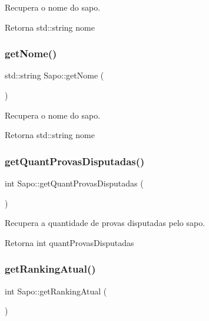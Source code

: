 Recupera o nome do sapo. 

\begin{DoxyReturn}{Retorna}
std\+::string nome 
\end{DoxyReturn}
\mbox{\label{classSapo_a632ae419accb86c10fa2bf8164e648aa}} 
\subsubsection{\texorpdfstring{get\+Nome()}{getNome()}}
{\footnotesize\ttfamily std\+::string Sapo\+::get\+Nome (\begin{DoxyParamCaption}{ }\end{DoxyParamCaption})}



Recupera o nome do sapo. 

\begin{DoxyReturn}{Retorna}
std\+::string nome 
\end{DoxyReturn}
\mbox{\label{classSapo_ab111c0490da381fb037ab7be723cfc54}} 
\subsubsection{\texorpdfstring{get\+Quant\+Provas\+Disputadas()}{getQuantProvasDisputadas()}}
{\footnotesize\ttfamily int Sapo\+::get\+Quant\+Provas\+Disputadas (\begin{DoxyParamCaption}{ }\end{DoxyParamCaption})}



Recupera a quantidade de provas disputadas pelo sapo. 

\begin{DoxyReturn}{Retorna}
int quant\+Provas\+Disputadas 
\end{DoxyReturn}
\mbox{\label{classSapo_abc038f72258ba546123efa8d1eb4c392}} 
\subsubsection{\texorpdfstring{get\+Ranking\+Atual()}{getRankingAtual()}}
{\footnotesize\ttfamily int Sapo\+::get\+Ranking\+Atual (\begin{DoxyParamCaption}{ }\end{DoxyParamCaption})}



